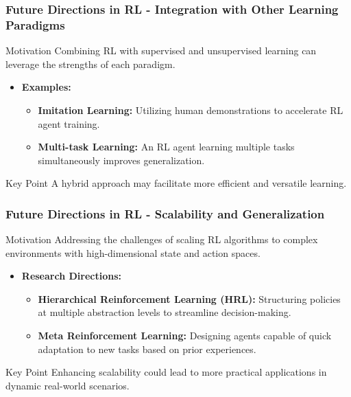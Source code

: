 \documentclass[aspectratio=169]{beamer}
\begin{document}
\begin{frame}[fragile]
    \frametitle{Future Directions in RL - Integration with Other Learning Paradigms}
    \begin{block}{Motivation}
        Combining RL with supervised and unsupervised learning can leverage the strengths of each paradigm.
    \end{block}
    \begin{itemize}
        \item \textbf{Examples:}
            \begin{itemize}
                \item \textbf{Imitation Learning:} Utilizing human demonstrations to accelerate RL agent training.
                \item \textbf{Multi-task Learning:} An RL agent learning multiple tasks simultaneously improves generalization.
            \end{itemize}
    \end{itemize}
    \begin{block}{Key Point}
        A hybrid approach may facilitate more efficient and versatile learning.
    \end{block}
\end{frame}

\begin{frame}[fragile]
    \frametitle{Future Directions in RL - Scalability and Generalization}
    \begin{block}{Motivation}
        Addressing the challenges of scaling RL algorithms to complex environments with high-dimensional state and action spaces.
    \end{block}
    \begin{itemize}
        \item \textbf{Research Directions:}
            \begin{itemize}
                \item \textbf{Hierarchical Reinforcement Learning (HRL):} Structuring policies at multiple abstraction levels to streamline decision-making.
                \item \textbf{Meta Reinforcement Learning:} Designing agents capable of quick adaptation to new tasks based on prior experiences.
            \end{itemize}
    \end{itemize}
    \begin{block}{Key Point}
        Enhancing scalability could lead to more practical applications in dynamic real-world scenarios.
    \end{block}
\end{frame}
\end{document}
